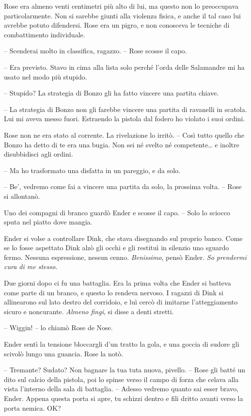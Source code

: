 {Rose era almeno venti centimetri più alto di lui, ma questo non lo
	preoccupava particolarmente. Non si sarebbe giunti alla violenza fisica,
	e anche il tal caso lui avrebbe potuto difendersi. Rose era un pigro, e
	non conosceva le tecniche di combattimento individuale.}

{-- Scenderai molto in classifica, ragazzo. -- Rose scosse il capo.}

{-- Era previsto. Stavo in cima alla lista solo perché l'orda delle
	Salamandre mi ha usato nel modo più stupido.}

{-- Stupido? La strategia di Bonzo gli ha fatto vincere una partita
	chiave.}

{-- La strategia di Bonzo non gli farebbe vincere una partita di
	ravanelli in scatola. Lui mi aveva messo fuori. Estraendo la pistola dal
	fodero ho violato i suoi ordini.}

{Rose non ne era stato al corrente. La rivelazione lo irritò. -- Così
	tutto quello che Bonzo ha detto di te era una bugia. Non sei né svelto
	né competente\ldots{} e inoltre disubbidisci agli ordini.}

{-- Ma ho trasformato una disfatta in un pareggio, e da solo.}

{-- Be', vedremo come fai a vincere una partita da solo, la prossima
	volta. -- Rose si allontanò.}

{Uno dei compagni di branco guardò Ender e scosse il capo. -- Solo lo
	sciocco sputa nel piatto dove mangia.}

{Ender si volse a controllare Dink, che stava disegnando sul proprio
	banco. Come se lo fosse aspettato Dink alzò gli occhi e gli restituì in
	silenzio uno sguardo fermo. Nessuna espressione, nessun cenno.
	\emph{Benissimo}, \emph{} pensò Ender. \emph{So prendermi cura di me
		stesso.}}

{Due giorni dopo ci fu una battaglia. Era la prima volta che Ender si
	batteva come parte di un branco, e questo lo rendeva nervoso. I ragazzi
	di Dink si allinearono sul lato destro del corridoio, e luì cercò di
	imitarne l'atteggiamento sicuro e noncurante. \emph{Almeno fingi},
	\emph{} si disse a denti stretti.}

{-- Wiggin! -- lo chiamò Rose de Nose.}

{Ender sentì la tensione bloccargli d'un tratto la gola, e una goccia di
	sudore gli scivolò lungo una guancia. Rose la notò.}

{-- Tremante? Sudato? Non bagnare la tua tuta nuova, pivello. -- Rose
	gli batté un dito sul calcio della pistola, poi lo spinse verso il campo
	di forza che celava alla vista l'interno della sala di battaglia. --
	Adesso vedremo quanto sai esser bravo, Ender. Appena questa porta si
	apre, tu schizzi dentro e fili dritto avanti verso la porta nemica. OK?}

